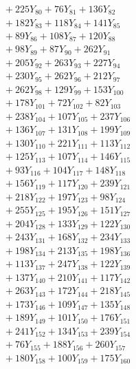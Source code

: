 \documentclass[a4paper,10pt]{article}
\begin{document}
{\begin{align}
&\;  + 225 Y_{80} + 76 Y_{81} + 136 Y_{82} \\[0.3ex]
&\;  + 182 Y_{83} + 118 Y_{84} + 141 Y_{85} \\[0.3ex]
&\;  + 89 Y_{86} + 108 Y_{87} + 120 Y_{88} \\[0.5ex]\allowbreak
&\;  + 98 Y_{89} + 87 Y_{90} + 262 Y_{91} \\[0.3ex]
&\;  + 205 Y_{92} + 263 Y_{93} + 227 Y_{94} \\[0.3ex]
&\;  + 230 Y_{95} + 262 Y_{96} + 212 Y_{97} \\[0.3ex]
&\;  + 262 Y_{98} + 129 Y_{99} + 153 Y_{100} \\[0.3ex]
&\;  + 178 Y_{101} + 72 Y_{102} + 82 Y_{103} \\[0.3ex]
&\;  + 238 Y_{104} + 107 Y_{105} + 237 Y_{106} \\[0.3ex]
&\;  + 136 Y_{107} + 131 Y_{108} + 199 Y_{109} \\[0.3ex]
&\;  + 130 Y_{110} + 221 Y_{111} + 113 Y_{112} \\[0.3ex]
&\;  + 125 Y_{113} + 107 Y_{114} + 146 Y_{115} \\[0.3ex]
&\;  + 93 Y_{116} + 104 Y_{117} + 148 Y_{118} \\[0.5ex]\allowbreak
&\;  + 156 Y_{119} + 117 Y_{120} + 239 Y_{121} \\[0.3ex]
&\;  + 218 Y_{122} + 197 Y_{123} + 98 Y_{124} \\[0.3ex]
&\;  + 255 Y_{125} + 195 Y_{126} + 151 Y_{127} \\[0.3ex]
&\;  + 204 Y_{128} + 133 Y_{129} + 122 Y_{130} \\[0.3ex]
&\;  + 243 Y_{131} + 168 Y_{132} + 234 Y_{133} \\[0.3ex]
&\;  + 198 Y_{134} + 213 Y_{135} + 198 Y_{136} \\[0.3ex]
&\;  + 113 Y_{137} + 247 Y_{138} + 122 Y_{139} \\[0.3ex]
&\;  + 137 Y_{140} + 210 Y_{141} + 117 Y_{142} \\[0.3ex]
&\;  + 263 Y_{143} + 172 Y_{144} + 218 Y_{145} \\[0.3ex]
&\;  + 173 Y_{146} + 109 Y_{147} + 135 Y_{148} \\[0.5ex]\allowbreak
&\;  + 189 Y_{149} + 101 Y_{150} + 176 Y_{151} \\[0.3ex]
&\;  + 241 Y_{152} + 134 Y_{153} + 239 Y_{154} \\[0.3ex]
&\;  + 76 Y_{155} + 188 Y_{156} + 260 Y_{157} \\[0.3ex]
&\;  + 180 Y_{158} + 100 Y_{159} + 175 Y_{160} \\[0.3ex]

\end{align}}
\end{document}
